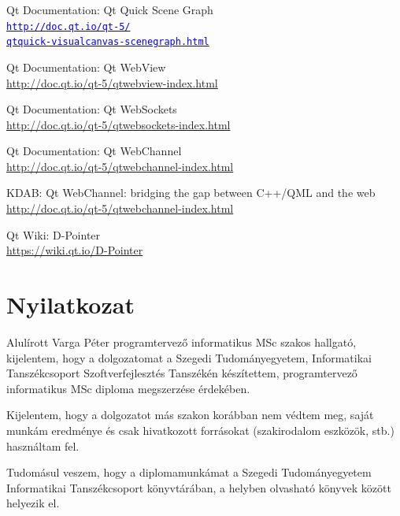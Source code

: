 \documentclass[12pt]{report}
\let\orighref\href
\renewcommand{\href}[2]{%
    \orighref{#1}{\textcolor{blue}{\texttt{#2}}}
}
\let\origurl\url
\renewcommand{\url}[1]{%
    \textcolor{blue}{\origurl{#1}}
}
\begin{document}
\begin{thebibliography}{9}
        Qt Documentation: Qt Quick Scene Graph \\
        \href{http://doc.qt.io/qt-5/qtquick-visualcanvas-scenegraph.html}
        {http://doc.qt.io/qt-5/\\
        qtquick-visualcanvas-scenegraph.html}

        Qt Documentation: Qt WebView \\
        \url{http://doc.qt.io/qt-5/qtwebview-index.html}

        Qt Documentation: Qt WebSockets \\
        \url{http://doc.qt.io/qt-5/qtwebsockets-index.html}

        Qt Documentation: Qt WebChannel \\
        \url{http://doc.qt.io/qt-5/qtwebchannel-index.html}

        KDAB: Qt WebChannel: bridging the gap between C++/QML and the web \\
        \url{http://doc.qt.io/qt-5/qtwebchannel-index.html}

        Qt Wiki: D-Pointer \\
        \url{https://wiki.qt.io/D-Pointer}

\end{thebibliography}


\chapter*{Nyilatkozat}

\noindent
Alulírott Varga Péter programtervező informatikus MSc szakos hallgató, kijelentem, hogy a
dolgozatomat a Szegedi Tudományegyetem, Informatikai Tanszékcsoport Szoftverfejlesztés
Tanszékén készítettem, programtervező informatikus MSc diploma megszerzése érdekében.

Kijelentem, hogy a dolgozatot más szakon korábban nem védtem meg, saját munkám eredménye
és csak hivatkozott forrásokat (szakirodalom eszközök, stb.) használtam fel.

Tudomásul veszem, hogy a diplomamunkámat a Szegedi Tudományegyetem Informatikai Tanszékcsoport
könyvtárában, a helyben olvasható könyvek között helyezik el.

\vspace*{2cm}
\end{document}
